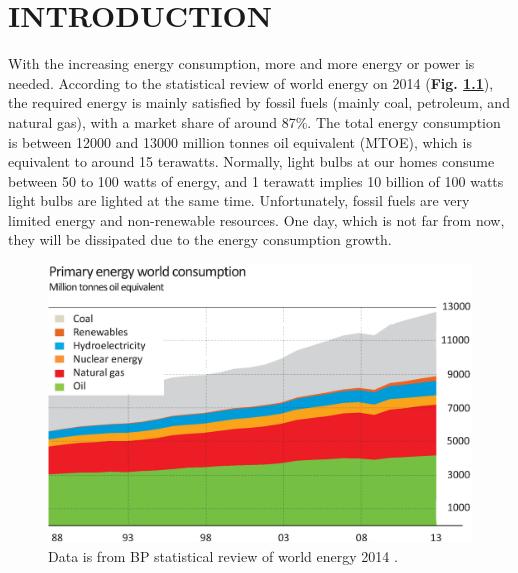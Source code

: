 \documentclass[a4paper, 12pt, titlepage,oneside,drop]{kthesis}
\begin{document}
\newpage
\setcounter{page}{7}
\setcounter{secnumdepth}{3}
\setcounter{tocdepth}{3}
\renewcommand\contentsname{Table of Contents}

\tableofcontents



\newpage
{}
\renewcommand{\thesection}{\arabic{chapter}.\arabic{section}}  
\renewcommand{\thetable}{\arabic{chapter}.\arabic{table}}  
\renewcommand{\thefigure}{\arabic{chapter}.\arabic{figure}} 
\renewcommand{\theequation}{\arabic{chapter}.\arabic{equation}} 
\renewcommand{\chaptername}{}



\chapter{INTRODUCTION}

With the increasing energy consumption, more and more energy or power is needed. According to the statistical review of world energy on 2014 \cite{bp} (\textbf{Fig. \ref{wpec}}),
the required energy is mainly satisfied by fossil fuels (mainly coal, petroleum, and natural gas), with a market share of around 87\%. The total energy consumption is between 12000 and 13000 million tonnes oil
equivalent (MTOE), which is equivalent to around 15 terawatts\cite{xie2014creating}. Normally, light bulbs at our homes consume between 50 to 100 watts of energy, and 1 terawatt implies 10 billion of 100 watts light bulbs are lighted at the
same time. Unfortunately, fossil fuels are very limited energy and non-renewable resources. One day, which is not far from now, they will be dissipated due to the energy consumption growth.

\begin{figure}[H]
\centering
\includegraphics[scale=0.4]{energy.eps}
\caption{Data is from BP statistical review of world energy 2014 \cite{bp}.}
\label{wpec}
\end{figure}
\end{document}
